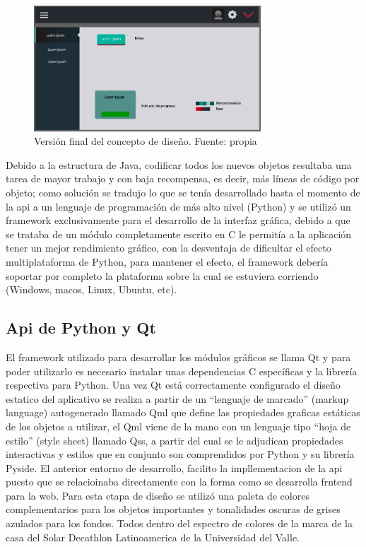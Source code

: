 \begin{figure}[htbp]
	\centerline{\includegraphics[width=8.5cm]{./figuras/house_manager_version_3.png}}
	\caption{Versión final del concepto de diseño. Fuente: propia}
	\label{fig_22}
\end{figure}

Debido a la estructura de Java, codificar todos los nuevos objetos resultaba una tarea de mayor trabajo y con baja recompensa, es decir, más líneas de código por objeto; como solución se tradujo lo que se tenía desarrollado hasta el momento de la api a un lenguaje de programación de más alto nivel (Python) y se utilizó un framework exclusivamente para el desarrollo de la interfaz gráfica, debido a que se trataba de un módulo completamente escrito en C le permitía a la aplicación tener un mejor rendimiento gráfico, con la desventaja de dificultar el efecto multiplataforma de Python, para mantener el efecto, el framework debería soportar por completo la plataforma sobre la cual se estuviera corriendo (Windows, macos, Linux, Ubuntu, etc).

\subsection{Api de Python y Qt}

El framework utilizado para desarrollar los módulos gráficos se llama Qt y para poder utilizarlo es necesario instalar unas dependencias C específicas y la librería respectiva para Python. Una vez Qt está correctamente configurado el diseño estatico del aplicativo se realiza a partir de un ``lenguaje de marcado'' (markup language) autogenerado llamado Qml que define las propiedades graficas estáticas de los objetos a utilizar, el Qml viene de la mano con un lenguaje tipo ``hoja de estilo'' (style sheet) llamado Qss, a partir del cual se le adjudican propiedades interactivas y estilos que en conjunto son comprendidos por Python y su librería Pyside. El anterior entorno de desarrollo, facilito la impllementacion de la api puesto que se relacioinaba directamente con la forma como se desarrolla frntend para la web.
Para esta etapa de diseño se utilizó una paleta de colores complementarios para los objetos importantes y tonalidades oscuras de grises azulados para los fondos. Todos dentro del espectro de colores de la marca de la casa del Solar Decathlon Latinoamerica de la Universidad del Valle.

